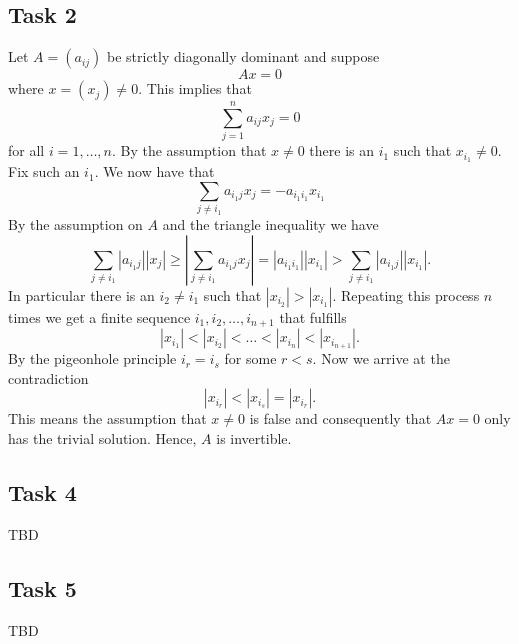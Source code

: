 \documentclass[a4paper,12pt]{article}
\begin{document}
\subsection*{Task 2}

Let \(A = (a_{ij})\) be strictly diagonally dominant and suppose
\[ Ax = 0 \]
where \(x = (x_j) \ne 0\).
This implies that
\[ \sum_{j=1}^n a_{ij} x_j = 0 \]
for all \(i = 1, \dots, n\).
By the assumption that \(x \ne 0\) there is an \(i_1\) such that
\(x_{i_1} \ne 0\).
Fix such an \(i_1\).
We now have that
\[ \sum_{j \ne i_1} a_{i_1j} x_j = -a_{i_1i_1}x_{i_1} \]
By the assumption on \(A\) and the triangle inequality we have
\[
  \sum_{j \ne i_1} |a_{i_1j}| |x_j|
    \ge \left| \sum_{j \ne i_1} a_{i_1j} x_j \right|
    = |a_{i_1i_1}| |x_{i_1}|
    > \sum_{j \ne i_1} |a_{i_1j}| |x_{i_1}|.
\]
In particular there is an \(i_2 \ne i_1\) such that \(|x_{i_2}| > |x_{i_1}|\).
Repeating this process \(n\) times we get a finite sequence
\(i_1, i_2, \dots, i_{n+1}\) that fulfills
\[ |x_{i_1}| < |x_{i_2}| < \dots < |x_{i_n}| < |x_{i_{n+1}}|. \]
By the pigeonhole principle \(i_r = i_s\) for some \(r < s\).
Now we arrive at the contradiction
\[ |x_{i_r}| < |x_{i_s}| = |x_{i_r}|. \]
This means the assumption that \(x \ne 0\) is false and consequently that
\(Ax = 0\) only has the trivial solution.
Hence, \(A\) is invertible.


\subsection*{Task 4}

TBD


\subsection*{Task 5}

TBD
\end{document}
